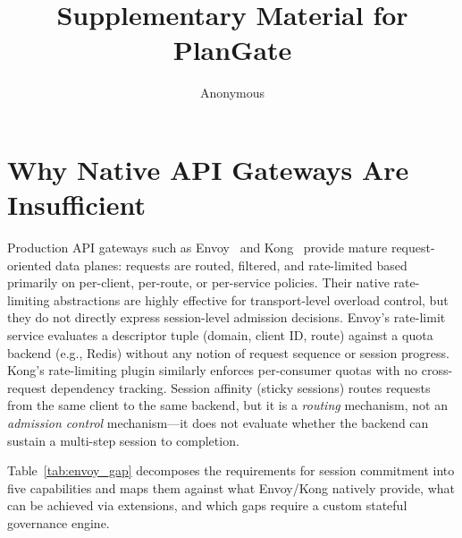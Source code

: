 \documentclass[sigconf,anonymous]{acmart}
\begin{document}
\title{Supplementary Material for PlanGate}
\author{Anonymous}
\maketitle

\section{Why Native API Gateways Are Insufficient}
\label{sec:envoy_analysis}

Production API gateways such as Envoy~\cite{envoy} and Kong~\cite{kong} provide mature request-oriented data planes: requests are routed, filtered, and rate-limited based primarily on per-client, per-route, or per-service policies. Their native rate-limiting abstractions are highly effective for transport-level overload control, but they do not directly express session-level admission decisions. Envoy's rate-limit service evaluates a descriptor tuple (domain, client ID, route) against a quota backend (e.g., Redis) without any notion of request sequence or session progress. Kong's rate-limiting plugin similarly enforces per-consumer quotas with no cross-request dependency tracking. Session affinity (sticky sessions) routes requests from the same client to the same backend, but it is a \emph{routing} mechanism, not an \emph{admission control} mechanism---it does not evaluate whether the backend can sustain a multi-step session to completion.

Table~\ref{tab:envoy_gap} decomposes the requirements for session commitment into five capabilities and maps them against what Envoy/Kong natively provide, what can be achieved via extensions, and which gaps require a custom stateful governance engine.
\end{document}
